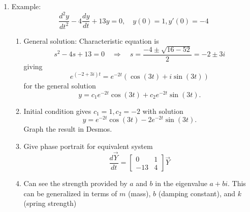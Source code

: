 \documentclass{article}
\begin{document}
\begin{enumerate}
\item Example:
\[
\frac{d^2 y}{dt^2} -4\frac{dy}{dt} + 13y = 0, \quad y(0)=1, y'(0)=-4
\]
\begin{enumerate}
\item General solution: Characteristic equation is
\[
s^2-4s+13=0 \quad \Rightarrow \quad s = \frac{-4\pm \sqrt{16-52}}{2}=-2 \pm 3i
\]
giving
\[
e^{(-2+3i)t} = e^{-2t} (\cos(3t)+i\sin(3t))
\]
for the general solution
\[
y = c_1 e^{-2t}\cos(3t) +c_2e^{-2t} \sin(3t).
\]
\item Initial condition gives $c_1=1, c_2=-2$ with solution
\[
y = e^{-2t}\cos(3t) -2e^{-2t} \sin(3t).
\]
Graph the result in Desmos.
\item Give phase portrait for equivalent system
\[
\frac{d \vec{Y}}{dt} = \begin{bmatrix}
0 & 1 \\
-13 & 4
\end{bmatrix} \vec{Y}
\]
\item Can see the strength provided by  $a$ and $b$ in the eigenvalue $a+bi$. This can be generalized in terms of $m$ (mass), $b$ (damping constant), and $k$ (spring strength)
\end{enumerate}


\end{enumerate}
\end{document}
